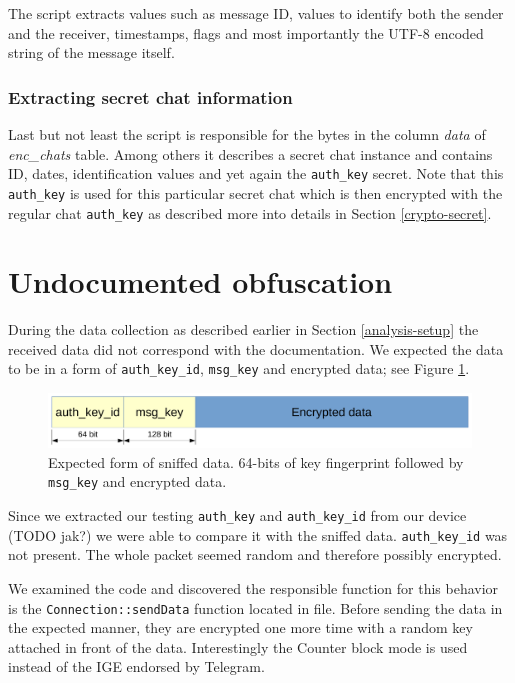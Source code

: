 \documentclass[thesis=M,english]{FITthesis}[2012/10/20]
\begin{document}
The script extracts values such as message ID, values to identify both the sender and the receiver, timestamps, flags and most importantly the UTF-8 encoded string of the message itself.

\subsubsection{Extracting secret chat information}

Last but not least the  script is responsible for the bytes in the column \emph{data} of \emph{enc\_chats} table. Among others it describes a secret chat instance and contains ID, dates, identification values and yet again the \texttt{auth\_key} secret. Note that this \texttt{auth\_key} is used for this particular secret chat which is then encrypted with the regular chat \texttt{auth\_key} as described more into details in Section \ref{crypto-secret}.

\section{Undocumented obfuscation}\label{analysis-obf}

During the data collection as described earlier in Section \ref{analysis-setup} the received data did not correspond with the documentation. We expected the data to be in a form of \texttt{auth\_key\_id}, \texttt{msg\_key} and encrypted data; see Figure \ref{img:analysis-obf-expected}.

\begin{figure}[htb]
	\centering
	\includegraphics[width=1\textwidth]{sniffed-expected.pdf}
	\caption{Expected form of sniffed data. 64-bits of key fingerprint followed by \texttt{msg\_key} and encrypted data.}
	\label{img:analysis-obf-expected}
\end{figure}

Since we extracted our testing \texttt{auth\_key} and \texttt{auth\_key\_id} from our device (TODO jak?) we were able to compare it with the sniffed data. \texttt{auth\_key\_id} was not present. The whole packet seemed random and therefore possibly encrypted.

We examined the code and discovered the responsible function for this behavior is the \texttt{Connection::sendData} function located in  file. Before sending the data in the expected manner, they are encrypted one more time with a random key attached in front of the data. Interestingly the Counter block mode is used instead of the IGE endorsed by Telegram.
\end{document}
